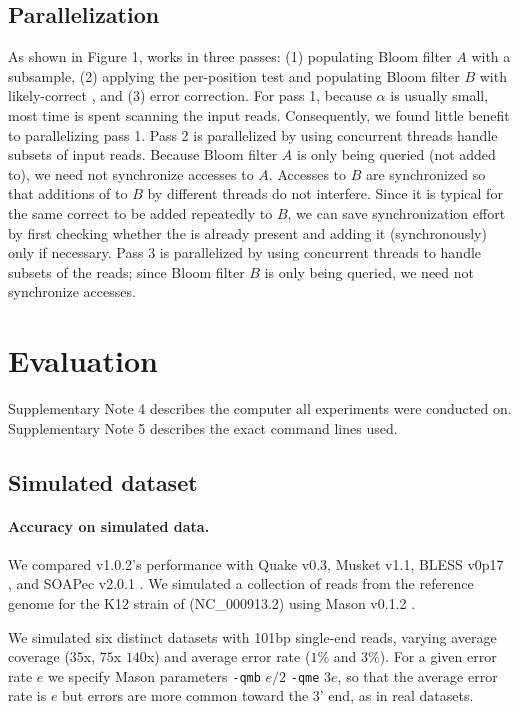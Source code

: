 \documentclass{bmcart}
\begin{document}
\subsection*{Parallelization} 
As shown in Figure 1, \tool works in three passes: (1) populating Bloom filter $A$ with a \kmer subsample, (2) applying the per-position test and populating Bloom filter $B$ with likely-correct \kmers, and (3) error correction.  For pass 1, because $\alpha$ is usually small, most time is spent scanning the input reads.  Consequently, we found little benefit to parallelizing pass 1.  Pass 2 is parallelized by using concurrent threads handle subsets of input reads.  Because Bloom filter $A$ is only being queried (not added to), we need not synchronize accesses to $A$.  Accesses to $B$ are synchronized so that additions of \kmers to $B$ by different threads do not interfere.  Since it is typical for the same correct \kmer to be added repeatedly to $B$, we can save synchronization effort by first checking whether the \kmer is already present and adding it (synchronously) only if necessary.  Pass 3 is parallelized by using concurrent threads to handle subsets of the reads; since Bloom filter $B$ is only being queried, we need not synchronize accesses.

\section*{Evaluation}

Supplementary Note 4 describes the computer all experiments were conducted on.  Supplementary Note 5 describes the exact command lines used.

\subsection*{Simulated dataset}

\paragraph{Accuracy on simulated data.} We compared \tool v1.0.2's performance with Quake v0.3\cite{kelley2010quake}, Musket v1.1\cite{liu2013musket}, BLESS v0p17 \cite{heo2014bless}, and SOAPec v2.0.1 \cite{luo2012soapdenovo2}.  We simulated a collection of reads from the reference genome for the K12 strain of \ecoli (NC\_000913.2) using Mason v0.1.2 \cite{holtgrewe2010mason}.  

We simulated six distinct datasets with 101bp single-end reads, varying average coverage ($35$x, $75$x $140$x) and average error rate ($1\%$ and $3\%$).  For a given error rate $e$ we specify Mason parameters \verb+-qmb+ $e/2$ \verb+-qme+ $3e$, so that the average error rate is $e$ but errors are more common toward the 3' end, as in real datasets.
\end{document}
